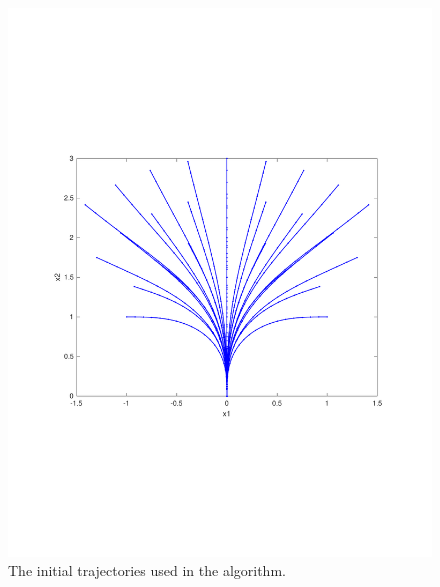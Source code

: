 \begin{figure}
  \centering
  \includegraphics[scale=.5]{figures/experiments/initial-trajectories}
  \caption{The initial trajectories used in the \rrtfunnel{} algorithm.}
  \label{fig:intial-trajectories-exp}
\end{figure}

